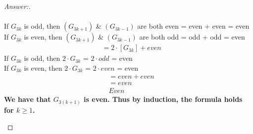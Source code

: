 \documentclass[11pt]{article}
\theoremstyle{definition}
\theoremstyle{definition}
\theoremstyle{definition}
\begin{document}
\begin{proof}[Answer:]
\begin{itemize}
\begin{align*}
\end{align*}
If $G_{3k}$ is odd, then $(G_{3k + 1})$ \& $(G_{3k - 1})$ are both even = even + even = even \\
If $G_{3k}$ is even, then $(G_{3k + 1})$ \& $(G_{3k - 1})$ are both odd = odd + odd = even
\begin{align*}
&= 2 \cdot [G_{3k}] + even
\end{align*}
If $G_{3k}$ is odd, then $2 \cdot G_{3k}$ = $2 \cdot odd$ = even \\
If $G_{3k}$ is even, then $2 \cdot G_{3k}$ = $2 \cdot even$ = even
\begin{align*}
&= even + even \\
&= even \\
&Even
\end{align*}
\textbf{We have that $G_{3(k + 1)}$ is even. Thus by induction, the formula holds for $k \geq 1$.}
\end{itemize}

\end{proof}

\end{document}
